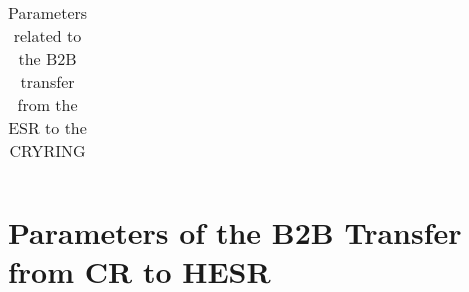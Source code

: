 \begin{longtable}{ | c | c | c | c | c | c |}
   \caption{Parameters related to the B2B transfer from the ESR to the CRYRING}
	\label{ESRtoCRYRING}
\end{longtable}
 
 

\newpage
\section{Parameters of the B2B Transfer from CR to HESR}
\label{sec:CRtoHESR}
 
